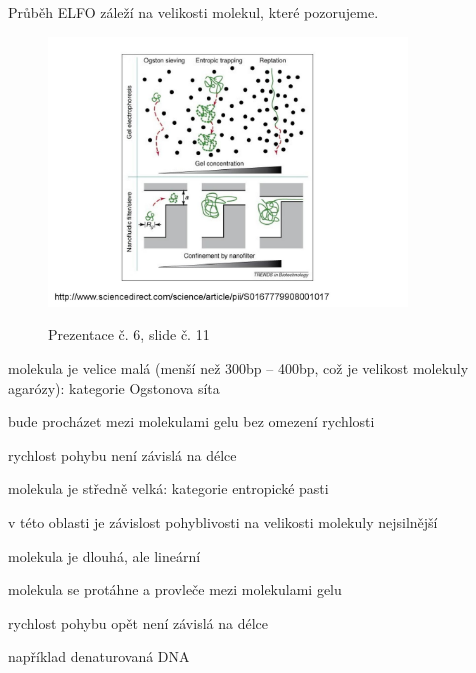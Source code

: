 \documentclass[DIV=8]{scrreprt}
\begin{document}
Průběh ELFO záleží na velikosti molekul, které pozorujeme.
\begin{figure}
    \caption{Prezentace č. 6, slide č. 11}
    \includegraphics[width=0.85\textwidth]{slides-6/slide-11.jpg}
    \centering
    \label{slides-6-slide-11}
\end{figure}

\begin{myEnumerate}[nosep]
    \item molekula je velice malá (menší než 300bp -- 400bp, což je velikost molekuly agarózy): kategorie Ogstonova síta
\begin{myItemize}[nosep]
    \item bude procházet mezi molekulami gelu bez omezení rychlosti
    \item rychlost pohybu není závislá na délce
\end{myItemize}

    \item molekula je středně velká: kategorie entropické pasti
\begin{myItemize}[nosep]
    \item v této oblasti je závislost pohyblivosti na velikosti molekuly nejsilnější
\end{myItemize}

    \item molekula je dlouhá, ale lineární
\begin{myItemize}[nosep]
    \item molekula se protáhne a provleče mezi molekulami gelu
    \item rychlost pohybu opět není závislá na délce
    \item například denaturovaná DNA
\end{myItemize}

\end{myEnumerate}
\end{document}
